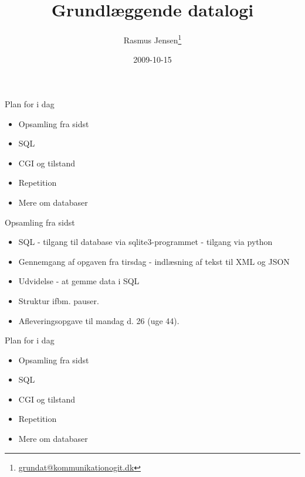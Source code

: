 \documentclass[a4paper,landscape]{slides}
\title{Grundlæggende datalogi}
\author{Rasmus Jensen\footnote{\url{grundat@kommunikationogit.dk}}}
\date{2009-10-15}
\begin{document}
\maketitle

\begin{slide}
	\begin{center} {\large 
            Plan for i dag
	} \end{center}
	\begin{itemize} \addtolength{\itemsep}{-\baselineskip}
		\item Opsamling fra sidst
		\item SQL
		\item CGI og tilstand
		\item Repetition
		\item Mere om databaser
	\end{itemize}
\end{slide}


\begin{slide}
	\begin{center} {\large 
            Opsamling fra sidst
	} \end{center}
	\begin{itemize} \addtolength{\itemsep}{-\baselineskip}
            \item SQL - tilgang til database via sqlite3-programmet - tilgang via python
            \item Gennemgang af opgaven fra tirsdag - indlæsning af tekst til XML og JSON
            \item Udvidelse - at gemme data i SQL
            \item Struktur ifbm. pauser.
            \item Afleveringsopgave til mandag d. 26 (uge 44).
	\end{itemize}
\end{slide}

\begin{slide}
	\begin{center} {\large 
            Plan for i dag
	} \end{center}
	\begin{itemize} \addtolength{\itemsep}{-\baselineskip}
		\item Opsamling fra sidst
		\item SQL
		\item CGI og tilstand
		\item Repetition
		\item Mere om databaser
	\end{itemize}
\end{slide}
\end{document}
